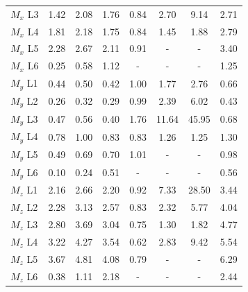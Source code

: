 \begin{table}[h]
\begin{tabular}{lccccccc}
$M_x$ L3 & 1.42 & 2.08 & 1.76 & 0.84 & 2.70 & 9.14 & 2.71 \\
$M_x$ L4 & 1.81 & 2.18 & 1.75 & 0.84 & 1.45 & 1.88 & 2.79 \\
$M_x$ L5 & 2.28 & 2.67 & 2.11 & 0.91 & - & - & 3.40 \\
$M_x$ L6 & 0.25 & 0.58 & 1.12 & - & - & - & 1.25 \\
$M_y$ L1 & 0.44 & 0.50 & 0.42 & 1.00 & 1.77 & 2.76 & 0.66 \\
$M_y$ L2 & 0.26 & 0.32 & 0.29 & 0.99 & 2.39 & 6.02 & 0.43 \\
$M_y$ L3 & 0.47 & 0.56 & 0.40 & 1.76 & 11.64 & 45.95 & 0.68 \\
$M_y$ L4 & 0.78 & 1.00 & 0.83 & 0.83 & 1.26 & 1.25 & 1.30 \\
$M_y$ L5 & 0.49 & 0.69 & 0.70 & 1.01 & - & - & 0.98 \\
$M_y$ L6 & 0.10 & 0.24 & 0.51 & - & - & - & 0.56 \\
$M_z$ L1 & 2.16 & 2.66 & 2.20 & 0.92 & 7.33 & 28.50 & 3.44 \\
$M_z$ L2 & 2.28 & 3.13 & 2.57 & 0.83 & 2.32 & 5.77 & 4.04 \\
$M_z$ L3 & 2.80 & 3.69 & 3.04 & 0.75 & 1.30 & 1.82 & 4.77 \\
$M_z$ L4 & 3.22 & 4.27 & 3.54 & 0.62 & 2.83 & 9.42 & 5.54 \\
$M_z$ L5 & 3.67 & 4.81 & 4.08 & 0.79 & - & - & 6.29 \\
$M_z$ L6 & 0.38 & 1.11 & 2.18 & - & - & - & 2.44 \\
\bottomrule
\end{tabular}
\end{table}
